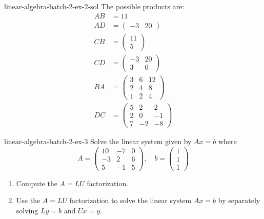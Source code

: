 \documentclass[preview]{standalone}
\begin{document}
\begin{snippetsolution}{linear-algebra-batch-2-ex-2-sol}{}
    The possible products are:
    \begin{align*}
        AB &= 11 \\
        AD &= \begin{pmatrix}-3 & 20\end{pmatrix} \\
        CB &= \begin{pmatrix}11 \\ 5\end{pmatrix} \\
        CD &= \begin{pmatrix}-3 & 20 \\ 3 & 0\end{pmatrix} \\
        BA &= \begin{pmatrix}3 & 6 & 12 \\ 2 & 4 & 8 \\ 1 & 2 & 4\end{pmatrix} \\
        DC &= \begin{pmatrix}5 & 2 & 2 \\ 2 & 0 & -1 \\ 7 & -2 & -8\end{pmatrix}
    \end{align*}
\end{snippetsolution}

\begin{snippetexercise}{linear-algebra-batch-2-ex-3}{}
    Solve the linear system given by \(Ax = b\) where
    \[
        A = \begin{pmatrix}
            10 & -7 & 0 \\ -3 & 2 & 6 \\ 5 & -1 & 5
        \end{pmatrix}, \quad
        b = \begin{pmatrix}
            1 \\ 1 \\ 1
        \end{pmatrix}
    \]
    \begin{enumerate}
        \item Compute the \(A = LU\) factorization.
        \item Use the \(A = LU\) factorization to solve the linear system \(Ax = b\)
        by separately solving \(Ly = b\) and \(Ux = y\).
    \end{enumerate}
\end{snippetexercise}
\end{document}
